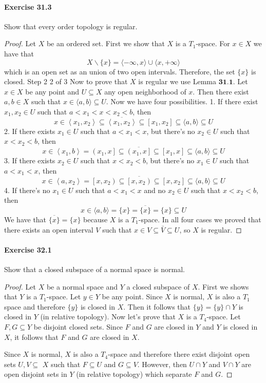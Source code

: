 \documentclass{article}
\begin{document}
\paragraph{Exercise 31.3} Show that every order topology is regular.
\begin{proof}
    Let $X$ be an ordered set.
First we show that $X$ is a $T_1$-space. For $x \in X$ we have that
$$
X \backslash\{x\}=\langle-\infty, x\rangle \cup\langle x,+\infty\rangle
$$
which is an open set as an union of two open intervals. Therefore, the set $\{x\}$ is closed.
Step 2
2 of 3
Now to prove that $X$ is regular we use Lemma $\mathbf{3 1 . 1 .}$
Let $x \in X$ be any point and $U \subseteq X$ any open neighborhood of $x$. Then there exist $a, b \in X$ such that $x \in\langle a, b\rangle \subseteq U$. Now we have four possibilities.
1. If there exist $x_1, x_2 \in U$ such that $a<x_1<x<x_2<b$, then
$$
x \in\left\langle x_1, x_2\right\rangle \subseteq \overline{\left\langle x_1, x_2\right\rangle} \subseteq\left[x_1, x_2\right] \subseteq\langle a, b\rangle \subseteq U
$$
2. If there exists $x_1 \in U$ such that $a<x_1<x$, but there's no $x_2 \in U$ such that $x<x_2<b$, then
$$
x \in\left\langle x_1, b\right\rangle=\left(x_1, x\right] \subseteq \overline{\left(x_1, x\right]} \subseteq\left[x_1, x\right] \subseteq\langle a, b\rangle \subseteq U
$$
3. If there exists $x_2 \in U$ such that $x<x_2<b$, but there's no $x_1 \in U$ such that $a<x_1<x$, then
$$
x \in\left\langle a, x_2\right\rangle=\left[x, x_2\right) \subseteq \overline{\left[x, x_2\right)} \subseteq\left[x, x_2\right] \subseteq\langle a, b\rangle \subseteq U
$$
4. If there's no $x_1 \in U$ such that $a<x_1<x$ and no $x_2 \in U$ such that $x<x_2<b$, then
$$
x \in\langle a, b\rangle=\{x\}=\overline{\{x\}}=\{x\} \subseteq U
$$
We have that $\overline{\{x\}}=\{x\}$ because $X$ is a $T_1$-space.
In all four cases we proved that there exists an open interval $V$ such that $x \in V \subseteq \bar{V} \subseteq U$, so $X$ is regular.
\end{proof}



\paragraph{Exercise 32.1} Show that a closed subspace of a normal space is normal.
\begin{proof}
    Let $X$ be a normal space and $Y$ a closed subspace of $X$.
First we shows that $Y$ is a $T_1$-space.
Let $y \in Y$ be any point. Since $X$ is normal, $X$ is also a $T_1$ space and therefore $\{y\}$ is closed in $X$.
Then it follows that $\{y\}=\{y\} \cap Y$ is closed in $Y$ (in relative topology).
Now let's prove that $X$ is a $T_4$-space.
Let $F, G \subseteq Y$ be disjoint closed sets. Since $F$ and $G$ are closed in $Y$ and $Y$ is closed in $X$, it follows that $F$ and $G$ are closed in $X$.

Since $X$ is normal, $X$ is also a $T_4$-space and therefore there exist disjoint open sets $U, V \subseteq$ $X$ such that $F \subseteq U$ and $G \subseteq V$.
However, then $U \cap Y$ and $V \cap Y$ are open disjoint sets in $Y$ (in relative topology) which separate $F$ and $G$.
\end{proof}
\end{document}
